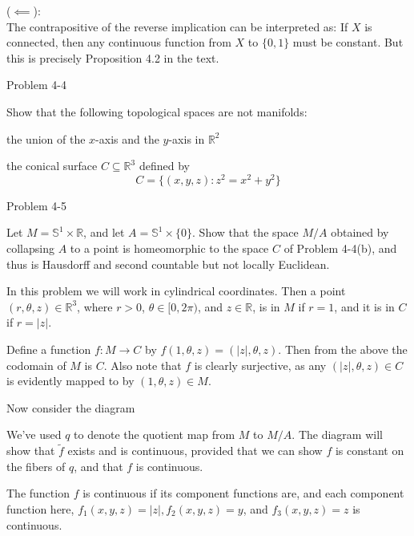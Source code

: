 \documentclass[minion]{homework651}
\newcommand{\nextprob}{\newpage}
\newcommand{\RR}{\mathbb{R}}
\newcommand{\ra}{\rightarrow}
\begin{document}
\begin{aproblems}
($\impliedby$):\\
The contrapositive of the reverse implication can be interpreted as:
If $X$ is connected, then any continuous function from $X$ to $\{0,1\}$ must
be constant.  But this is precisely Proposition 4.2 in the text.

\nextprob
\hproblem Problem 4-4

Show that the following topological spaces are not manifolds:

\begin{subproblems}
\item the union of the $x$-axis and the $y$-axis in $\mathbb{R}^2$
\item the conical surface $C\subseteq \mathbb{R}^3$ defined by
\begin{equation*}
C=\{(x,y,z):z^2=x^2+y^2\}
\end{equation*}
\end{subproblems}

\subsol

\subsol

\nextprob
\hproblem Problem 4-5

Let $M=\mathbb{S}^1\times\mathbb{R}$, and let $A=\mathbb{S}^1\times\{0\}$.
Show that the space $M/A$ obtained by collapsing $A$ to a point is homeomorphic
to the space $C$ of Problem 4-4(b), and thus is Hausdorff and second countable
but not locally Euclidean.

\solution
In this problem we will work in cylindrical coordinates.  Then a point
$(r,\theta,z)\in\RR^3$, where $r>0$, $\theta\in[0,2\pi)$,
and $z\in\RR$, is in $M$ if $r=1$, and it is in $C$ if $r=|z|$.

Define a function $f:M\ra C$ by $f(1,\theta,z)=(|z|,\theta,z)$. Then
from the above the codomain of $M$ is $C$.  Also note that $f$ is
clearly surjective, as any $(|z|,\theta,z)\in C$ is evidently mapped to
by $(1,\theta,z)\in M$.

Now consider the diagram

\centerline{
}

We've used $q$ to denote the quotient map from $M$ to $M/A$. The diagram will
show that $\tilde f$ exists and is continuous, provided that we can show
$f$ is constant on the fibers of $q$, and that $f$ is continuous.

The function $f$ is continuous if its component functions are, and each
component function here, $f_1(x,y,z)=|z|, f_2(x,y,z)=y$, and $f_3(x,y,z)=z$
is continuous.


\end{aproblems}
\end{document}
